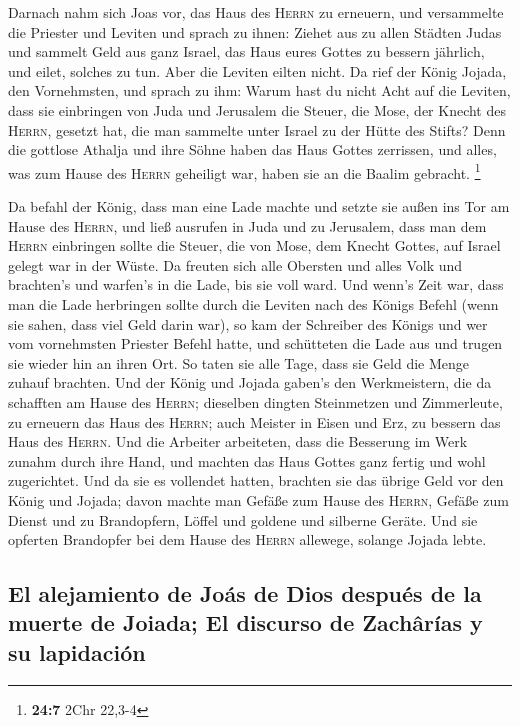  Darnach nahm sich Joas vor, das Haus des \textsc{Herrn}
zu erneuern,  und versammelte die Priester und Leviten und
sprach zu ihnen: Ziehet aus zu allen Städten Judas und sammelt Geld aus
ganz Israel, das Haus eures Gottes zu bessern jährlich, und eilet,
solches zu tun. Aber die Leviten eilten nicht.  Da rief
der König Jojada, den Vornehmsten, und sprach zu ihm: Warum hast du
nicht Acht auf die Leviten, dass sie einbringen von Juda und Jerusalem
die Steuer, die Mose, der Knecht des \textsc{Herrn}, gesetzt hat, die
man sammelte unter Israel zu der Hütte des Stifts?  Denn
die gottlose Athalja und ihre Söhne haben das Haus Gottes zerrissen, und
alles, was zum Hause des \textsc{Herrn} geheiligt war, haben sie an die
Baalim gebracht. \footnote{\textbf{24:7} 2Chr 22,3-4}

 Da befahl der König, dass man eine Lade machte und setzte
sie außen ins Tor am Hause des \textsc{Herrn},  und ließ
ausrufen in Juda und zu Jerusalem, dass man dem \textsc{Herrn}
einbringen sollte die Steuer, die von Mose, dem Knecht Gottes, auf
Israel gelegt war in der Wüste.  Da freuten sich alle
Obersten und alles Volk und brachten's und warfen's in die Lade, bis sie
voll ward.  Und wenn's Zeit war, dass man die Lade
herbringen sollte durch die Leviten nach des Königs Befehl (wenn sie
sahen, dass viel Geld darin war), so kam der Schreiber des Königs und
wer vom vornehmsten Priester Befehl hatte, und schütteten die Lade aus
und trugen sie wieder hin an ihren Ort. So taten sie alle Tage, dass sie
Geld die Menge zuhauf brachten.  Und der König und Jojada
gaben's den Werkmeistern, die da schafften am Hause des \textsc{Herrn};
dieselben dingten Steinmetzen und Zimmerleute, zu erneuern das Haus des
\textsc{Herrn}; auch Meister in Eisen und Erz, zu bessern das Haus des
\textsc{Herrn}.  Und die Arbeiter arbeiteten, dass die
Besserung im Werk zunahm durch ihre Hand, und machten das Haus Gottes
ganz fertig und wohl zugerichtet.  Und da sie es
vollendet hatten, brachten sie das übrige Geld vor den König und Jojada;
davon machte man Gefäße zum Hause des \textsc{Herrn}, Gefäße zum Dienst
und zu Brandopfern, Löffel und goldene und silberne Geräte. Und sie
opferten Brandopfer bei dem Hause des \textsc{Herrn} allewege, solange
Jojada lebte.

\hypertarget{el-alejamiento-de-jouxe1s-de-dios-despuuxe9s-de-la-muerte-de-joiada-el-discurso-de-zachuxe2ruxedas-y-su-lapidaciuxf3n}{%
\subsection{El alejamiento de Joás de Dios después de la muerte de
Joiada; El discurso de Zachârías y su
lapidación}\label{el-alejamiento-de-jouxe1s-de-dios-despuuxe9s-de-la-muerte-de-joiada-el-discurso-de-zachuxe2ruxedas-y-su-lapidaciuxf3n}}


